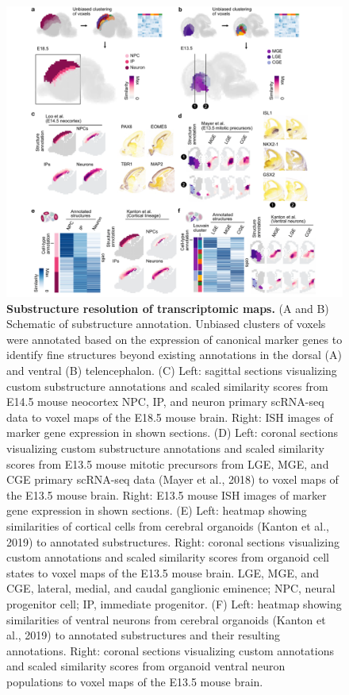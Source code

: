 \begin{figure}[b!]
    \centering
	\includegraphics[width=\textwidth]{figures/voxhunt/Figure_5}
    \caption{\textbf{Substructure resolution of transcriptomic maps.} (A and B) Schematic of substructure annotation. Unbiased clusters of voxels were annotated based on the expression of canonical marker genes to identify fine structures beyond existing annotations in the dorsal (A) and ventral (B) telencephalon. (C) Left: sagittal sections visualizing custom substructure annotations and scaled similarity scores from E14.5 mouse neocortex NPC, IP, and neuron primary scRNA-seq data to voxel maps of the E18.5 mouse brain. Right: ISH images of marker gene expression in shown sections. (D) Left: coronal sections visualizing custom substructure annotations and scaled similarity scores from E13.5 mouse mitotic precursors from LGE, MGE, and CGE primary scRNA-seq data (Mayer et al., 2018) to voxel maps of the E13.5 mouse brain. Right: E13.5 mouse ISH images of marker gene expression in shown sections. (E) Left: heatmap showing similarities of cortical cells from cerebral organoids (Kanton et al., 2019) to annotated substructures. Right: coronal sections visualizing custom annotations and scaled similarity scores from organoid cell states to voxel maps of the E13.5 mouse brain. LGE, MGE, and CGE, lateral, medial, and caudal ganglionic eminence; NPC, neural progenitor cell; IP, immediate progenitor. (F) Left: heatmap showing similarities of ventral neurons from cerebral organoids (Kanton et al., 2019) to annotated substructures and their resulting annotations. Right: coronal sections visualizing custom annotations and scaled similarity scores from organoid ventral neuron populations to voxel maps of the E13.5 mouse brain.}
    \label{fig:vox5}
\end{figure}

